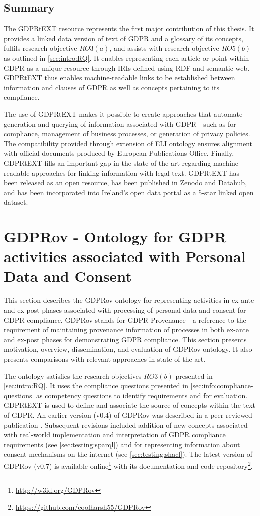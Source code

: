 \subsection*{Summary}
The GDPRtEXT resource represents the first major contribution of this thesis. It provides a linked data version of text of GDPR and a glossary of its concepts, fulfils research objective $RO3(a)$, and assists with research objective $RO5(b)$ - as outlined in \autoref{sec:intro:RQ}. It enables representing each article or point within GDPR as a unique resource through IRIs defined using RDF and semantic web.
GDPRtEXT thus enables machine-readable links to be established between information and clauses of GDPR as well as concepts pertaining to its compliance.

The use of GDPRtEXT makes it possible to create approaches that automate generation and querying of information associated with GDPR - such as for compliance, management of business processes, or generation of privacy policies. The compatibility provided through extension of ELI ontology ensures alignment with official documents produced by European Publications Office.
Finally, GDPRtEXT fills an important gap in the state of the art regarding machine-readable approaches for linking information with legal text.
GDPRtEXT has been released as an open resource, has been published in Zenodo and Datahub, and has been incorporated into Ireland’s open data portal as a 5-star linked open dataset.

\section{GDPRov - Ontology for GDPR activities associated with Personal Data and Consent}\label{sec:voc:GDPRov}
This section describes the GDPRov ontology for representing activities in ex-ante and ex-post phases associated with processing of personal data and consent for GDPR compliance. GDPRov stands for GDPR Provenance - a reference to the requirement of maintaining provenance information of processes in both ex-ante and ex-post phases for demonstrating GDPR compliance. This section presents motivation, overview, dissemination, and evaluation of GDPRov ontology. It also presents comparisons with relevant approaches in state of the art. 

The ontology satisfies the research objectives $RO3(b)$ presented in \autoref{sec:intro:RQ}.
It uses the compliance questions presented in \autoref{sec:info:compliance-questions} as competency questions to identify requirements and for evaluation.
GDPRtEXT is used to define and associate the source of concepts within the text of GDPR.
An earlier version (v0.4) of GDPRov was described in a peer-reviewed publication \cite{pandit_modelling_2017}.
Subsequent revisions included addition of new concepts associated with real-world implementation and interpretation of GDPR compliance requirements (see \autoref{sec:testing:sparql}) and for representing information about consent mechanisms on the internet (see \autoref{sec:testing:shacl}).
The latest version of GDPRov (v0.7) is available online\footnote{\url{http://w3id.org/GDPRov}} with its documentation and code repository\footnote{\url{https://github.com/coolharsh55/GDPRov}}.

